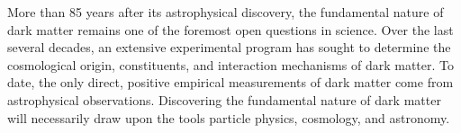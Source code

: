 \documentclass[12pt]{article}
\begin{document}
More than 85 years after its astrophysical discovery, the fundamental nature of dark matter remains one of the foremost open questions in science.
Over the last several decades, an extensive experimental program has sought to determine the cosmological origin, constituents, and interaction mechanisms of dark matter. 
To date, the only direct, positive empirical measurements of dark matter come from astrophysical observations.
Discovering the fundamental nature of dark matter will necessarily draw upon the tools particle physics, cosmology, and astronomy.
\end{document}
